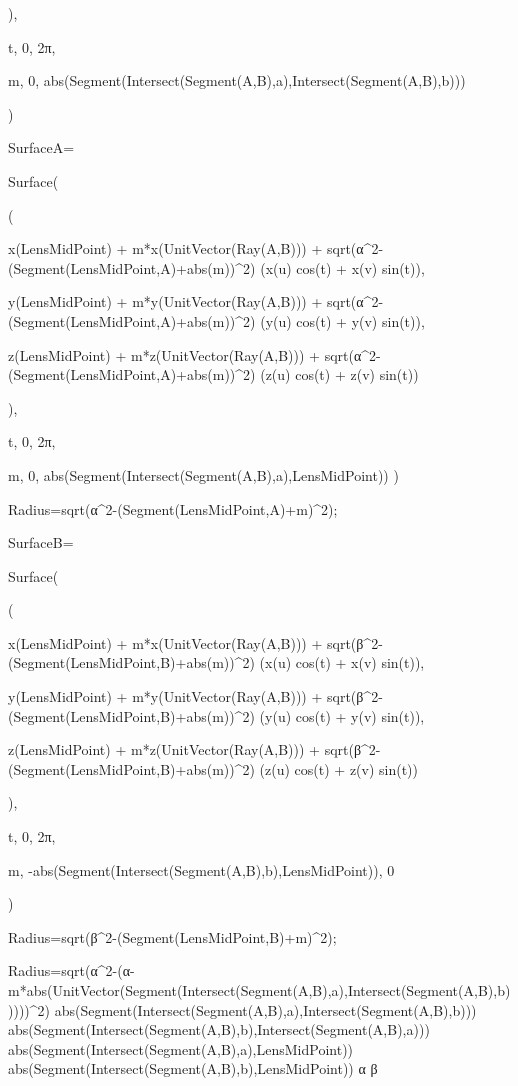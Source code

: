     ),

    t, 0, 2π, 

    m, 0, abs(Segment(Intersect(Segment(A,B),a),Intersect(Segment(A,B),b)))
    
    )


SurfaceA=

  Surface(

    (

    x(LensMidPoint) + m*x(UnitVector(Ray(A,B))) + sqrt(α^2-(Segment(LensMidPoint,A)+abs(m))^2) (x(u) cos(t) + x(v) sin(t)),

    y(LensMidPoint) + m*y(UnitVector(Ray(A,B))) + sqrt(α^2-(Segment(LensMidPoint,A)+abs(m))^2) (y(u) cos(t) + y(v) sin(t)),

    z(LensMidPoint) + m*z(UnitVector(Ray(A,B))) + sqrt(α^2-(Segment(LensMidPoint,A)+abs(m))^2) (z(u) cos(t) + z(v) sin(t))

    ),

    t, 0, 2π, 

    m, 0, abs(Segment(Intersect(Segment(A,B),a),LensMidPoint))
  )

  Radius=sqrt(α^2-(Segment(LensMidPoint,A)+m)^2);

SurfaceB=

  Surface(

    (

    x(LensMidPoint) + m*x(UnitVector(Ray(A,B))) + sqrt(β^2-(Segment(LensMidPoint,B)+abs(m))^2) (x(u) cos(t) + x(v) sin(t)),

    y(LensMidPoint) + m*y(UnitVector(Ray(A,B))) + sqrt(β^2-(Segment(LensMidPoint,B)+abs(m))^2) (y(u) cos(t) + y(v) sin(t)),

    z(LensMidPoint) + m*z(UnitVector(Ray(A,B))) + sqrt(β^2-(Segment(LensMidPoint,B)+abs(m))^2) (z(u) cos(t) + z(v) sin(t))

    ),

    t, 0, 2π, 

    m, -abs(Segment(Intersect(Segment(A,B),b),LensMidPoint)), 0

  )

  Radius=sqrt(β^2-(Segment(LensMidPoint,B)+m)^2);

  
Radius=sqrt(α^2-(α-m*abs(UnitVector(Segment(Intersect(Segment(A,B),a),Intersect(Segment(A,B),b)))))^2)
abs(Segment(Intersect(Segment(A,B),a),Intersect(Segment(A,B),b)))
abs(Segment(Intersect(Segment(A,B),b),Intersect(Segment(A,B),a)))
abs(Segment(Intersect(Segment(A,B),a),LensMidPoint))
abs(Segment(Intersect(Segment(A,B),b),LensMidPoint))
α
β